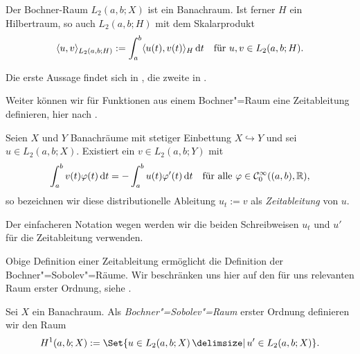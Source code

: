 \documentclass[../main.tex]{subfiles}
\begin{document}
\begin{Lemma}
\label{lemma:bochnerraum_ist_banachraum_bzw_hilbertraum}
    Der Bochner-Raum $L_{2}(a, b; X)$ ist ein Banachraum.
    Ist ferner $H$ ein Hilbertraum, so auch $L_{2}(a, b; H)$ mit dem Skalarprodukt
    \begin{equation}
        \skp{u}{v}{L_{2}(a, b; H)} := \int_{a}^{b} \skp{u(t)}{v(t)}{H} \diff t \quad \text{für}~u,v \in L_{2}(a, b; H).
    \end{equation}

    \begin{Beweis}
        Die erste Aussage findet sich in \cite[Proposition XVIII.1.1]{Dautray:1992by}, die zweite in \cite[Abschnitt 1.1.3]{Lions:1972tg}.
    \end{Beweis}
\end{Lemma}

Weiter können wir für Funktionen aus einem Bochner"=Raum eine Zeitableitung definieren, hier nach \cites[471]{Dautray:1992by}[Definition 10.6]{Schweizer2013}.

\begin{Definition}%
\label{definition:zeitableitung}
    Seien $X$ und $Y$ Banachräume mit stetiger Einbettung $X \hookrightarrow Y$ und sei $u \in L_{2}(a, b; X)$.
    Existiert ein $v \in L_{2}(a, b; Y)$ mit
    \begin{equation}
        \int_{a}^{b} v(t) \varphi(t) \diff t = - \int_{a}^{b} u(t) \varphi'(t) \diff t \quad \fa \varphi \in \mathcal C^{\infty}_{0}((a, b), \mathbb{R}),
    \end{equation}
    so bezeichnen wir diese distributionelle Ableitung $u_{t} := v$ als \emph{Zeitableitung} von $u$.
\end{Definition}

\begin{Bemerkung}
    Der einfacheren Notation wegen werden wir die beiden Schreibweisen $u_{t}$ und $u'$ für die Zeitableitung verwenden.
\end{Bemerkung}

Obige Definition einer Zeitableitung ermöglicht die Definition der Bochner"=Sobolev"=Räume.
Wir beschränken uns hier auf den für uns relevanten Raum erster Ordnung, siehe \cite[Section 5.9.2]{evans2010partial}.

\begin{Definition}
\label{definition:bochner_sobolev_raum}
    Sei $X$ ein Banachraum.
    Als \emph{Bochner"=Sobolev"=Raum} erster Ordnung definieren wir den Raum
    \begin{equation}
        H^{1}(a, b; X) := \Set{u \in L_{2}(a, b; X) \given u' \in L_{2}(a, b; X)}.
    \end{equation}
\end{Definition}
\end{document}
